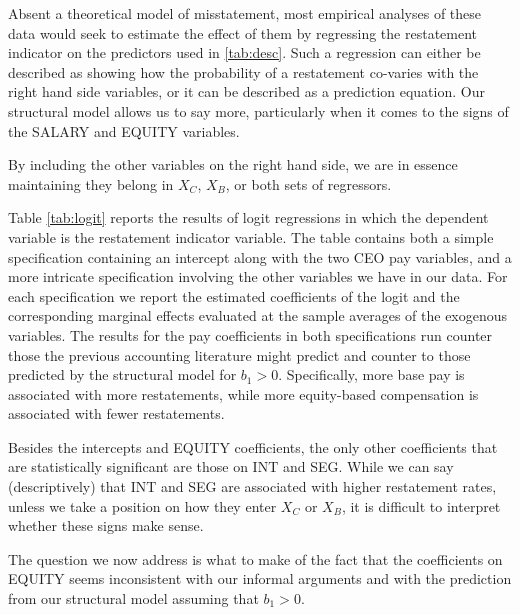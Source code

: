 Absent a theoretical model of misstatement, most empirical analyses of these data would seek to estimate the effect of  them by regressing the restatement indicator on the predictors used in \ref{tab:desc}.
Such a regression can either be described as showing how the probability of a restatement co-varies with the right hand side variables, or it can be described as a prediction equation.
Our structural model allows us to say more, particularly when it comes to the signs of the SALARY and EQUITY variables.

By including the other variables on the right hand side, we are in essence maintaining they belong in $X_C$, $X_B$, or both sets of regressors.

Table \ref{tab:logit} reports the results of logit regressions in which the dependent variable is the restatement indicator variable. 
The table contains both a simple specification containing an intercept along with the two CEO pay variables, and a more intricate specification involving the other variables we have in our data.
For each specification we report the estimated coefficients of the logit and the corresponding marginal effects evaluated at the sample averages of the exogenous variables.
The results for the pay coefficients in both specifications run counter those the previous accounting literature might predict and counter to those predicted by the structural model for $b_1 > 0$.
Specifically, more base pay is associated with more restatements, while more equity-based compensation is associated with fewer restatements.

Besides the intercepts and EQUITY coefficients, the only other coefficients that are statistically significant are those on INT and SEG.
While we can say (descriptively) that INT and SEG are associated with higher restatement rates, unless we take a position on how they enter $X_C$ or $X_B$, it is difficult to interpret whether these signs make sense.

The question we now address is what to make of the fact that the coefficients on EQUITY seems inconsistent with our informal arguments and with the prediction from our structural model assuming that $b_1>0$.

